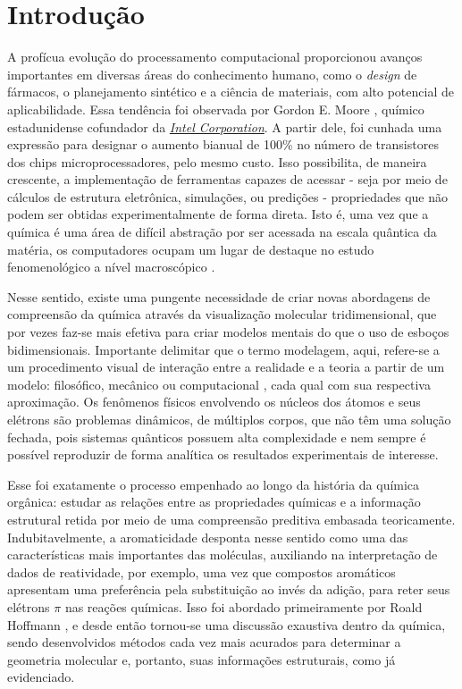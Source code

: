 \chapter{Introdução}

A profícua evolução do processamento computacional proporcionou avanços importantes em diversas áreas do conhecimento humano, como o \textit{design} de fármacos, o planejamento sintético e a ciência de materiais, com alto potencial de aplicabilidade. Essa tendência foi observada por Gordon E. Moore \autocite{Mack2011, Shalf2020}, químico estadunidense 
cofundador da \href{https://www.intel.com/content/www/us/en/company-overview/company-overview.html}{\textit{Intel Corporation}}. A partir dele, foi cunhada uma expressão para designar o aumento bianual de 100\% no número de transistores dos chips microprocessadores, pelo mesmo custo. Isso possibilita, de maneira crescente, a implementação de ferramentas capazes de acessar - seja por meio de cálculos de estrutura eletrônica, 
simulações, ou predições - propriedades que não podem ser obtidas experimentalmente de forma direta. Isto é, uma vez que a química é uma área de difícil abstração por ser acessada na escala quântica da matéria, os computadores ocupam um lugar de destaque no estudo fenomenológico a nível macroscópico \autocite{Allouche2010, Rayan2017}.

Nesse sentido, existe uma pungente necessidade de criar novas abordagens de compreensão da química através da visualização molecular tridimensional, que por vezes faz-se mais efetiva para criar modelos mentais do que o uso de esboços bidimensionais. Importante delimitar que o termo modelagem, aqui, refere-se a um procedimento visual de interação entre a realidade e a teoria a partir de um modelo: filosófico, mecânico ou computacional \autocite{Snyder2021}, cada qual com sua respectiva aproximação. Os fenômenos físicos envolvendo os núcleos dos átomos e seus elétrons são problemas dinâmicos, de múltiplos corpos, que não têm uma solução fechada, pois sistemas quânticos possuem alta complexidade e nem sempre é possível reproduzir de forma analítica os resultados experimentais de interesse.

Esse foi exatamente o processo empenhado ao longo da história da química orgânica: estudar as relações entre as propriedades químicas e a informação estrutural retida por meio de uma compreensão preditiva embasada teoricamente. Indubitavelmente, a aromaticidade desponta nesse sentido como uma das características mais importantes das moléculas, auxiliando na interpretação de dados de reatividade, por exemplo, uma vez que compostos aromáticos apresentam uma preferência pela substituição ao invés da adição, para reter seus elétrons $\pi$ nas reações químicas. Isso foi abordado primeiramente por Roald Hoffmann \autocite{Hoffmann2014}, e desde então tornou-se uma discussão exaustiva dentro da química, sendo desenvolvidos métodos cada vez mais acurados para determinar a geometria molecular e, portanto, suas informações estruturais, como já evidenciado.

